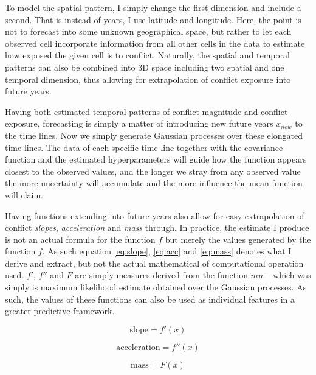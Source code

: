 \documentclass[a4paper]{article}
\begin{document}
To model the spatial pattern, I simply change the first dimension and include a second. That is instead of years, I use latitude and longitude. Here, the point is not to forecast into some unknown geographical space, but rather to let each observed cell incorporate information from all other cells in the data to estimate how exposed the given cell is to conflict. Naturally, the spatial and temporal patterns can also be combined into 3D space including two spatial and one temporal dimension, thus allowing for extrapolation of conflict exposure into future years.\par

Having both estimated temporal patterns of conflict magnitude and conflict exposure, forecasting is simply a matter of introducing new future years $x_{new}$ to the time lines. Now we simply generate Gaussian processes over these elongated time lines. The data of each specific time line together with the covariance function and the estimated hyperparameters will guide how the function appears closest to the observed values, and the longer we stray from any observed value the more uncertainty will accumulate and the more influence the mean function will claim.\par 

Having functions extending into future years also allow for easy extrapolation of conflict \emph{slopes}, \emph{acceleration} and \emph{mass} through. In practice, the estimate I produce is not an actual formula for the function $f$ but merely the values generated by the function $f$. As such equation \ref{eq:slope}, \ref{eq:acc} and \ref{eq:mass} denotes what I derive and extract, but not the actual mathematical of computational operation used. $f'$, $f''$ and $F$ are simply measures derived from the function $mu$ -- which was simply is maximum likelihood estimate obtained over the Gaussian processes. As such, the values of these functions can also be used as individual features in a greater predictive framework.\par 

\[
\text{slope} = f'(x)   \tag{11}  \label{eq:slope}
\]

\[
\text{acceleration} = f''(x) \tag{12}  \label{eq:acc}
\]

\[
\text{mass} = F(x) \tag{13}  \label{eq:mass}
\]
\end{document}
